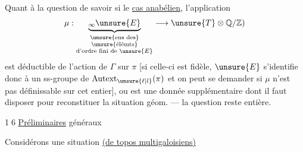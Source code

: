 Quant à la question de savoir si
 le \uline{cas anabélien},
l'application
\[
\mu:\underbrace{{}_\infty\unsure{E}}_{
\substack{\text{\unsure{ens des}}\\
\text{\unsure{élémts}}\\
\text{d'ordre fini de }\unsure{E}}}
\longrightarrow\unsure{T}\otimes\mathbb Q/\mathbb Z)
\]
est déductible de l'action de \(\Gamma\) sur \(\pi\)
[si celle-ci est fidèle, \(\unsure{E}\) s'identifie donc à un ss-groupe
de \(\operatorname{Autext}_{\unsure{\ell|l}}(\pi)\)
et on peut se demander si \(\mu\) n'est pas
 définissable sur cet  entier],
ou est une donnée supplémentaire dont il faut disposer pour
reconstituer la situation géom. --- la question reste entière.

\textcircled{16}\quad
{}
\uline{Préliminaires}  généraux

Considérons une situation
\uline{(de topos multigaloisiens)}

